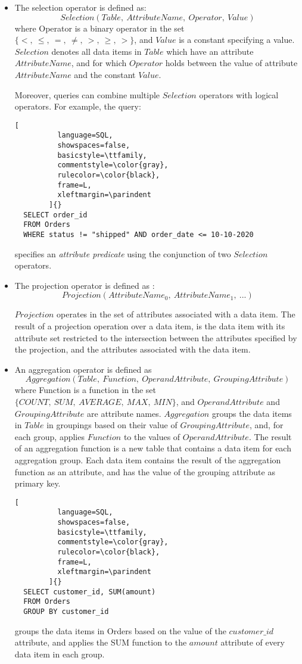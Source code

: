 \begin{itemize}
  \item The selection operator is defined as:
  \[
  Selection(Table,~AttributeName,~Operator,~Value)
  \]
  where Operator is a binary operator in the set $\{<,~\leq,~=,~\neq,~>,~\geq,~>\}$,
  and $Value$ is a constant specifying a value.
  $Selection$ denotes all data items in $Table$ which
  have an attribute $AttributeName$,
  and for which $Operator$ holds between the value of attribute $AttributeName$ and the constant $Value$.

  Moreover, queries can combine multiple $Selection$ operators with logical operators.
  For example, the query:

  \begin{lstlisting}[
          language=SQL,
          showspaces=false,
          basicstyle=\ttfamily,
          commentstyle=\color{gray},
          rulecolor=\color{black},
          frame=L,
          xleftmargin=\parindent
        ]{}
  SELECT order_id
  FROM Orders
  WHERE status != "shipped" AND order_date <= 10-10-2020
  \end{lstlisting}

  specifies an \textit{attribute predicate} using the conjunction of two $Selection$ operators.

  \item The projection operator is defined as :
  \[
  Projection(AttributeName_0,~AttributeName_1,~...)
  \]

  $Projection$ operates in the set of attributes associated with a data item.
  The result of a projection operation over a data item, is the data item with its attribute set restricted to the
  intersection between the attributes specified by the projection, and the attributes associated with the data item.

  \item An aggregation operator is defined as
  \[
  Aggregation(Table,~Function,~OperandAttribute,~GroupingAttribute)
  \]
  where Function is a function in the set $\{COUNT,~SUM,~AVERAGE,~MAX,~MIN\}$,
  and $OperandAttribute$ and $GroupingAttribute$ are attribute names.
  $Aggregation$ groups the data items in $Table$ in groupings based on their value of $GroupingAttribute$,
  and, for each group, applies $Function$ to the values of $OperandAttribute$.
  The result of an aggregation function is a new table that contains a data item for each aggregation group.
  Each data item contains the result of the aggregation function as an attribute, and has the value of the grouping attribute as primary key.

  \begin{lstlisting}[
          language=SQL,
          showspaces=false,
          basicstyle=\ttfamily,
          commentstyle=\color{gray},
          rulecolor=\color{black},
          frame=L,
          xleftmargin=\parindent
        ]{}
  SELECT customer_id, SUM(amount)
  FROM Orders
  GROUP BY customer_id
  \end{lstlisting}

  groups the data items in Orders based on the value of the $customer\_id$ attribute,
  and applies the SUM function to the $amount$ attribute of every data item in each group.
\end{itemize}


